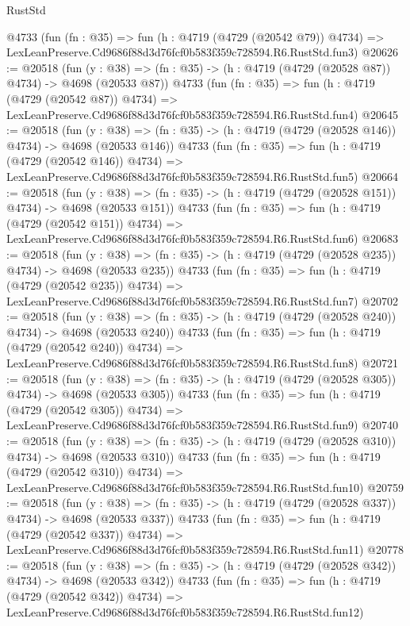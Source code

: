 \begin{lexlean}{RustStd}
\begin{coremodule}
    @4733
    (fun (fn : @35) =>
    fun (h : @4719 (@4729 (@20542 @79)) @4734) =>
    LexLeanPreserve.Cd9686f88d3d76fcf0b583f359c728594.R6.RustStd.fun3)
@20626 := @20518
    (fun (y : @38) => (fn : @35) -> (h : @4719 (@4729 (@20528 @87)) @4734) -> @4698 (@20533 @87))
    @4733
    (fun (fn : @35) =>
    fun (h : @4719 (@4729 (@20542 @87)) @4734) =>
    LexLeanPreserve.Cd9686f88d3d76fcf0b583f359c728594.R6.RustStd.fun4)
@20645 := @20518
    (fun (y : @38) => (fn : @35) -> (h : @4719 (@4729 (@20528 @146)) @4734) -> @4698 (@20533 @146))
    @4733
    (fun (fn : @35) =>
    fun (h : @4719 (@4729 (@20542 @146)) @4734) =>
    LexLeanPreserve.Cd9686f88d3d76fcf0b583f359c728594.R6.RustStd.fun5)
@20664 := @20518
    (fun (y : @38) => (fn : @35) -> (h : @4719 (@4729 (@20528 @151)) @4734) -> @4698 (@20533 @151))
    @4733
    (fun (fn : @35) =>
    fun (h : @4719 (@4729 (@20542 @151)) @4734) =>
    LexLeanPreserve.Cd9686f88d3d76fcf0b583f359c728594.R6.RustStd.fun6)
@20683 := @20518
    (fun (y : @38) => (fn : @35) -> (h : @4719 (@4729 (@20528 @235)) @4734) -> @4698 (@20533 @235))
    @4733
    (fun (fn : @35) =>
    fun (h : @4719 (@4729 (@20542 @235)) @4734) =>
    LexLeanPreserve.Cd9686f88d3d76fcf0b583f359c728594.R6.RustStd.fun7)
@20702 := @20518
    (fun (y : @38) => (fn : @35) -> (h : @4719 (@4729 (@20528 @240)) @4734) -> @4698 (@20533 @240))
    @4733
    (fun (fn : @35) =>
    fun (h : @4719 (@4729 (@20542 @240)) @4734) =>
    LexLeanPreserve.Cd9686f88d3d76fcf0b583f359c728594.R6.RustStd.fun8)
@20721 := @20518
    (fun (y : @38) => (fn : @35) -> (h : @4719 (@4729 (@20528 @305)) @4734) -> @4698 (@20533 @305))
    @4733
    (fun (fn : @35) =>
    fun (h : @4719 (@4729 (@20542 @305)) @4734) =>
    LexLeanPreserve.Cd9686f88d3d76fcf0b583f359c728594.R6.RustStd.fun9)
@20740 := @20518
    (fun (y : @38) => (fn : @35) -> (h : @4719 (@4729 (@20528 @310)) @4734) -> @4698 (@20533 @310))
    @4733
    (fun (fn : @35) =>
    fun (h : @4719 (@4729 (@20542 @310)) @4734) =>
    LexLeanPreserve.Cd9686f88d3d76fcf0b583f359c728594.R6.RustStd.fun10)
@20759 := @20518
    (fun (y : @38) => (fn : @35) -> (h : @4719 (@4729 (@20528 @337)) @4734) -> @4698 (@20533 @337))
    @4733
    (fun (fn : @35) =>
    fun (h : @4719 (@4729 (@20542 @337)) @4734) =>
    LexLeanPreserve.Cd9686f88d3d76fcf0b583f359c728594.R6.RustStd.fun11)
@20778 := @20518
    (fun (y : @38) => (fn : @35) -> (h : @4719 (@4729 (@20528 @342)) @4734) -> @4698 (@20533 @342))
    @4733
    (fun (fn : @35) =>
    fun (h : @4719 (@4729 (@20542 @342)) @4734) =>
    LexLeanPreserve.Cd9686f88d3d76fcf0b583f359c728594.R6.RustStd.fun12)

\end{coremodule}
\end{lexlean}
